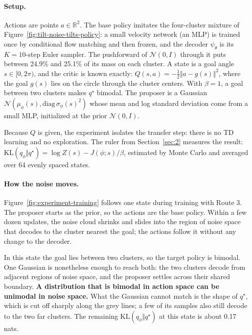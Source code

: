 \paragraph{Setup.} Actions are points $a \in \mathbb{R}^2$. The base policy imitates the four-cluster mixture of Figure~\ref{fig:tilt-noise-tilts-policy}: a small velocity network (an MLP) is trained once by conditional flow matching and then frozen, and the decoder $\psi_\theta$ is its $K = 10$-step Euler sampler. The pushforward of $\mathcal{N}(0, I)$ through it puts between 24.9\% and 25.1\% of its mass on each cluster. A state is a goal angle $s \in [0, 2\pi)$, and the critic is known exactly: $Q(s, a) = -\tfrac12 \Vert a - g(s) \Vert^2$, where the goal $g(s)$ lies on the circle through the cluster centers. With $\beta = 1$, a goal between two clusters makes $q^\star$ bimodal. The proposer is a Gaussian $\mathcal{N}(\mu_\phi(s), \mathrm{diag}\,\sigma_\phi(s)^2)$ whose mean and log standard deviation come from a small MLP, initialized at the prior $\mathcal{N}(0, I)$.

Because $Q$ is given, the experiment isolates the transfer step: there is no TD learning and no exploration. The ruler from Section~\ref{sec:2} measures the result: $\mathrm{KL}(q_\phi \Vert q^\star) = \log Z(s) - J(\phi; s)/\beta$, estimated by Monte Carlo and averaged over 64 evenly spaced states.

\paragraph{How the noise moves.} Figure~\ref{fig:experiment-training} follows one state during training with Route 3. The proposer starts as the prior, so the actions are the base policy. Within a few dozen updates, the noise cloud shrinks and slides into the region of noise space that decodes to the cluster nearest the goal; the actions follow it without any change to the decoder.

In this state the goal lies between two clusters, so the target policy is bimodal. One Gaussian is nonetheless enough to reach both: the two clusters decode from adjacent regions of noise space, and the proposer settles across their shared boundary. \textbf{A distribution that is bimodal in action space can be unimodal in noise space.} What the Gaussian cannot match is the shape of $q^\star$, which is cut off sharply along the grey lines; a few of its samples also still decode to the two far clusters. The remaining $\mathrm{KL}(q_\phi \Vert q^\star)$ at this state is about 0.17 nats.

